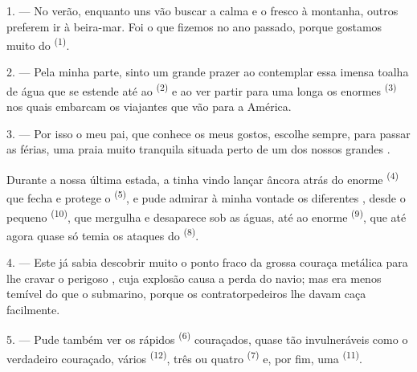 %

\VUsaut{4.0mm}
\VUsaut{3.0mm}
\VUsaut{3.0mm}

1. --- No verão, enquanto uns vão buscar a calma e o fresco à montanha,
outros preferem ir à beira-mar. Foi o que fizemos no ano passado, porque
gostamos muito do  \textsuperscript{(1)}.

2. --- Pela minha parte, sinto um grande prazer ao contemplar essa imensa
toalha de água que se estende até ao  \textsuperscript{(2)} e ao
ver partir para uma longa  os enormes  \textsuperscript{(3)} nos quais embarcam os viajantes que vão para a
América.

3. --- Por isso o meu pai, que conhece os meus gostos, escolhe sempre,
para passar as férias, uma praia muito tranquila situada perto de um dos
nossos grandes .

Durante a nossa última estada, a  tinha vindo lançar
âncora atrás do enorme  \textsuperscript{(4)} que fecha e
protege o  \textsuperscript{(5)}, e pude admirar à minha
vontade os diferentes , desde o pequeno
 \textsuperscript{(10)}, que mergulha e desaparece sob as águas,
até ao enorme  \textsuperscript{(9)}, que até agora quase só
temia os ataques do  \textsuperscript{(8)}.

\VUsaut{3.0mm}
\VUsaut{3.0mm}

4. --- Este já sabia descobrir muito  o ponto fraco da
grossa couraça metálica para lhe cravar o perigoso , cuja
explosão causa a perda do navio; mas era menos temível do que o
submarino, porque os contratorpedeiros lhe davam caça facilmente.

5. --- Pude também ver os rápidos  \textsuperscript{(6)}
couraçados, quase tão invulneráveis como o verdadeiro couraçado, vários
 \textsuperscript{(12)}, três ou quatro 
\textsuperscript{(7)} e, por fim, uma  \textsuperscript{(11)}. 

